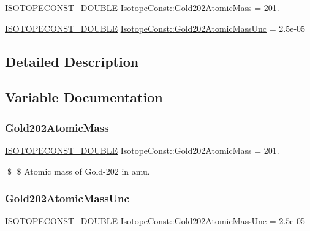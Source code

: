 \begin{DoxyCompactItemize}
\item 
\mbox{\hyperlink{group___isotope_const-_macros_ga8f45a7272ce02c0b4c65c44636ed719a}{I\+S\+O\+T\+O\+P\+E\+C\+O\+N\+S\+T\+\_\+\+D\+O\+U\+B\+LE}} \mbox{\hyperlink{group___isotope_const-_gold-_au202_ga1d8b35393c139d42cb8616ef67c987d0}{Isotope\+Const\+::\+Gold202\+Atomic\+Mass}} = 201.
\item 
\mbox{\hyperlink{group___isotope_const-_macros_ga8f45a7272ce02c0b4c65c44636ed719a}{I\+S\+O\+T\+O\+P\+E\+C\+O\+N\+S\+T\+\_\+\+D\+O\+U\+B\+LE}} \mbox{\hyperlink{group___isotope_const-_gold-_au202_gaee82a47a5c9aa2df4662c3357ae46748}{Isotope\+Const\+::\+Gold202\+Atomic\+Mass\+Unc}} = 2.\+5e-\/05
\end{DoxyCompactItemize}


\subsection{Detailed Description}


\subsection{Variable Documentation}
\mbox{\label{group___isotope_const-_gold-_au202_ga1d8b35393c139d42cb8616ef67c987d0}} 
\subsubsection{\texorpdfstring{Gold202\+Atomic\+Mass}{Gold202AtomicMass}}
{\footnotesize\ttfamily \mbox{\hyperlink{group___isotope_const-_macros_ga8f45a7272ce02c0b4c65c44636ed719a}{I\+S\+O\+T\+O\+P\+E\+C\+O\+N\+S\+T\+\_\+\+D\+O\+U\+B\+LE}} Isotope\+Const\+::\+Gold202\+Atomic\+Mass = 201.}

\$ \$ Atomic mass of Gold-\/202 in amu. \mbox{\label{group___isotope_const-_gold-_au202_gaee82a47a5c9aa2df4662c3357ae46748}} 
\subsubsection{\texorpdfstring{Gold202\+Atomic\+Mass\+Unc}{Gold202AtomicMassUnc}}
{\footnotesize\ttfamily \mbox{\hyperlink{group___isotope_const-_macros_ga8f45a7272ce02c0b4c65c44636ed719a}{I\+S\+O\+T\+O\+P\+E\+C\+O\+N\+S\+T\+\_\+\+D\+O\+U\+B\+LE}} Isotope\+Const\+::\+Gold202\+Atomic\+Mass\+Unc = 2.\+5e-\/05}

